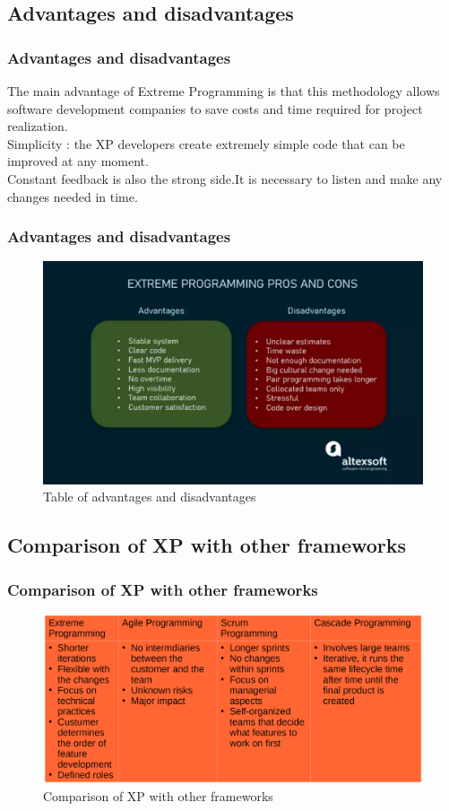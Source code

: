 \documentclass[
	11pt, 
]{beamer}
\begin{document}
\subsection{Advantages and disadvantages}
\begin{frame}
	\frametitle{Advantages and disadvantages}
The main advantage of Extreme Programming is that this methodology allows
software development companies to save costs and time required for project
realization.\\ \pause
Simplicity : the XP developers create extremely simple code that can be
improved at any moment.\\ \pause
Constant feedback is also the strong side.It is necessary to listen and make
any changes needed in time.\cite{p1,p4}
	\bigskip %
\end{frame}
\begin{frame}
	\frametitle{Advantages and disadvantages}
	\begin{figure}
		\includegraphics[width=0.8\linewidth]{ext5.pdf}
		\caption{Table of advantages and disadvantages \cite{p4}}
	\end{figure}
\end{frame}
\subsection{Comparison of XP with other frameworks}
\begin{frame}
	\frametitle{Comparison of XP with other frameworks}
	\begin{figure}
		\includegraphics[width=0.8\linewidth]{ext6.pdf}
		\caption{Comparison of XP with other frameworks \cite{p2}}
	\end{figure}
	\bigskip %
\end{frame}
\end{document}
